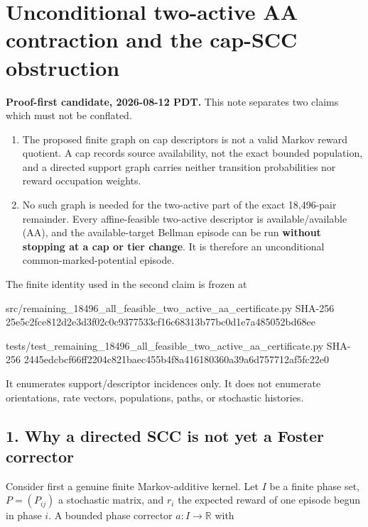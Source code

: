 \section{Unconditional two-active AA contraction and the cap-SCC
obstruction}

\textbf{Proof-first candidate, 2026-08-12 PDT.} This note separates two
claims which must not be conflated.

\begin{enumerate}
\def\labelenumi{\arabic{enumi}.}
\tightlist
\item
  The proposed finite graph on cap descriptors is not a valid Markov
  reward quotient. A cap records source availability, not the exact
  bounded population, and a directed support graph carries neither
  transition probabilities nor reward occupation weights.
\item
  No such graph is needed for the two-active part of the exact
  18,496-pair remainder. Every affine-feasible two-active descriptor is
  available/available (AA), and the available-target Bellman episode can
  be run \textbf{without stopping at a cap or tier change}. It is
  therefore an unconditional common-marked-potential episode.
\end{enumerate}

The finite identity used in the second claim is frozen at

\begin{CodeBlock}
src/remaining_18496_all_feasible_two_active_aa_certificate.py
SHA-256 25e5c2fce812d2e3d3f02c0c9377533cf16c68313b77bc0d1e7a485052bd68ee

tests/test_remaining_18496_all_feasible_two_active_aa_certificate.py
SHA-256 2445edcbcf66ff2204c821baec455b4f8a416180360a39a6d757712af5fc22e0
\end{CodeBlock}

It enumerates support/descriptor incidences only. It does not enumerate
orientations, rate vectors, populations, paths, or stochastic histories.

\subsection{1. Why a directed SCC is not yet a Foster
corrector}

Consider first a genuine finite Markov-additive kernel. Let \(I\) be a
finite phase set, \(P=(P_{ij})\) a stochastic matrix, and \(r_i\) the
expected reward of one episode begun in phase \(i\). A bounded phase
corrector \(a:I\to\mathbb R\) with

